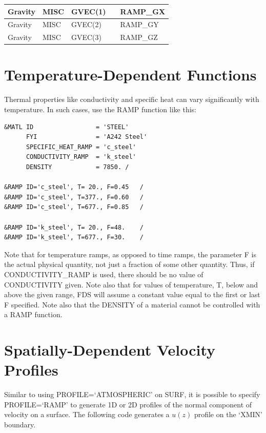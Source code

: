 \documentclass[11pt]{book}
\begin{document}
\begin{table}[ht]
\begin{center}
\begin{tabular}{|l|l|l|l|l|}
Gravity             & {\ct MISC}  & {\ct GVEC(1)}                                           &                     & {\ct RAMP\_GX}      \\ \hline
Gravity             & {\ct MISC}  & {\ct GVEC(2)}                                           &                     & {\ct RAMP\_GY}      \\ \hline
Gravity             & {\ct MISC}  & {\ct GVEC(3)}                                           &                     & {\ct RAMP\_GZ}      \\ \hline
\end{tabular}
\end{center}
\end{table}

\section{Temperature-Dependent Functions}
\label{info:RAMP_Temperature}

Thermal properties like conductivity and specific heat can vary significantly with temperature. In such cases, use
the {\ct RAMP} function like this:
\begin{lstlisting}
&MATL ID                 = 'STEEL'
      FYI                = 'A242 Steel'
      SPECIFIC_HEAT_RAMP = 'c_steel'
      CONDUCTIVITY_RAMP  = 'k_steel'
      DENSITY            = 7850. /

&RAMP ID='c_steel', T= 20., F=0.45   /
&RAMP ID='c_steel', T=377., F=0.60   /
&RAMP ID='c_steel', T=677., F=0.85   /

&RAMP ID='k_steel', T= 20., F=48.    /
&RAMP ID='k_steel', T=677., F=30.    /
\end{lstlisting}
Note that for temperature ramps, as opposed to time ramps, the parameter {\ct F} is the actual physical quantity, not just
a fraction of some other quantity. Thus, if {\ct CONDUCTIVITY\_RAMP} is used, there should be no
value of {\ct CONDUCTIVITY} given. Note also that for values of temperature, {\ct T}, below and above the
given range, FDS will assume a constant value equal to the first or last {\ct F} specified. Note also that the {\ct DENSITY} of a material cannot be controlled with a {\ct RAMP} function.


\section{Spatially-Dependent Velocity Profiles}
\label{info:RAMP_Vel_Prof}

Similar to using {\ct PROFILE=`ATMOSPHERIC'} on {\ct SURF}, it is possible to specify {\ct PROFILE=`RAMP'} to generate 1D or 2D profiles of the normal component of velocity on a surface.  The following code generates a $u(z)$ profile on the {\ct `XMIN'} boundary.
\end{document}
